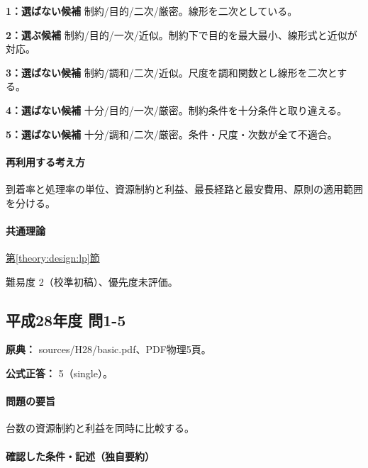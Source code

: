 \noindent\textbf{1：選ばない候補} 制約/目的/二次/厳密。線形を二次としている。\par

\noindent\textbf{2：選ぶ候補} 制約/目的/一次/近似。制約下で目的を最大最小、線形式と近似が対応。\par

\noindent\textbf{3：選ばない候補} 制約/調和/二次/近似。尺度を調和関数とし線形を二次とする。\par

\noindent\textbf{4：選ばない候補} 十分/目的/一次/厳密。制約条件を十分条件と取り違える。\par

\noindent\textbf{5：選ばない候補} 十分/調和/二次/厳密。条件・尺度・次数が全て不適合。\par

\paragraph{再利用する考え方} 到着率と処理率の単位、資源制約と利益、最長経路と最安費用、原則の適用範囲を分ける。

\paragraph{共通理論} \hyperref[theory:design:lp]{第\ref*{theory:design:lp}節}

\par 難易度 2（校準初稿）、優先度未評価。

\subsection{平成28年度 問1-5}
\label{q:h28-reg-basic-1-5}

\noindent\textbf{原典：} sources/H28/basic.pdf、PDF物理5頁。

\textbf{公式正答：} 5（single）。

\paragraph{問題の要旨} 台数の資源制約と利益を同時に比較する。

\paragraph{確認した条件・記述（独自要約）}\mbox{}\par


